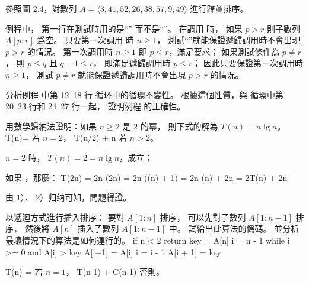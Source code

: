 \startsection[
  title={Designing algorithms},
]

\startEXERCISE
參照圖 2.4，對數列 $A=\langle 3,41,52,26,38,57,9,49\rangle$ 進行歸並排序。
\stopEXERCISE
\startANSWER
\externalfigure[output/e2_3_1-1]
\stopANSWER

\startEXERCISE
{} 例程中，
第一行在測試時用的是“” 而不是“”。
在調用  時，
如果 $p>r$ 則子數列 $A[p:r]$ 爲空。
只要第一次調用  時 $n\ge 1$，
測試“”就能保證遞歸調用時不會出現 $p>r$ 的情況。
\stopEXERCISE
\startANSWER
第一次調用時 $n\ge 1$ 即 $p\le r$，滿足要求；
如果測試條件為 $p\ne r$，
則 $p\le q$ 且 $q+1\le r$，
即滿足遞歸調用時 $p\le r$；
因此只要保證第一次調用時 $n\ge 1$，
測試 $p\ne r$ 就能保證遞歸調用時不會出現 $p>r$ 的情況。
\stopANSWER

\startEXERCISE
分析例程  中第 12~18 行  循环中的循環不變性。
根據這個性質，與  循環中第 20~23 行和 24~27 行一起，
證明例程  的正確性。
\stopEXERCISE
\startANSWER
{}
\stopANSWER

\startEXERCISE
用數學歸納法證明：如果 $n\ge 2$ 是 $2$ 的冪，
則下式的解為 $T(n)=n\lg n$。
\startformula
T(n)=\startmathcases
{} \NC 若 $n=2$，\NR
{} T(n/2) + n \NC 若 $n>2$。 \NR
\stopmathcases
\stopformula
\stopEXERCISE

\startANSWER
\startigBase[n]
\item $n=2$ 時， $T(n)=2=n\lg n$，成立；
\item 如果 ，那麼：
\startformula\startalign
\NC T(2n) \NC = 2n \lg(2n) \NR
\NC       \NC = 2n (\lg(n) + 1) \NR
\NC	      \NC = 2n \lg(n) + 2n \NR
\NC	      \NC = 2T(n) + 2n \NR
\stopalign\stopformula
\item 由 1）、 2）归纳可知，問題得證。
\stopigBase
\stopANSWER

\startEXERCISE
以遞迴方式進行插入排序：
要對 $A[1:n]$ 排序，
可以先對子數列 $A[1:n-1]$ 排序，
然後將 $A[n]$ 插入子數列 $A[1:n-1]$ 中。
試給出此算法的僞碼。
並分析最壞情況下的算法是如何運行的。
\stopEXERCISE
\startANSWER
{}
\startCLRSCODE
if n < 2
	return
key = A[n]
i = n - 1
while i >= 0 and A[i] > key
	A[i+1] = A[i]
	i = i - 1
A[i + 1] = key
\stopCLRSCODE

\startformula
T(n) = \startmathcases
{} \NC 若 $n = 1$， \NR
\NC T(n-1) + C(n-1)	\NC 否則。 \NR
\stopmathcases
\stopformula

